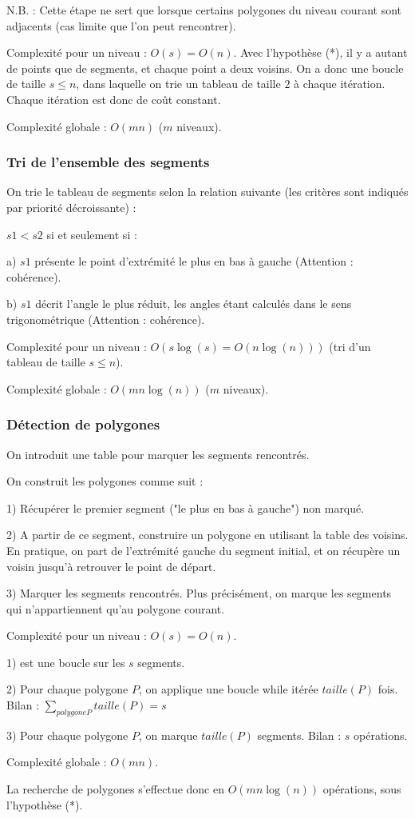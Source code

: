 \documentclass{article}
\begin{document}
N.B. : Cette étape ne sert que lorsque certains polygones du niveau courant sont adjacents (cas limite que l'on peut rencontrer).

Complexité pour un niveau : $O(s) =  O(n)$. Avec l'hypothèse (*), il y a autant de points que de segments, et chaque point a deux voisins. On a donc une boucle de taille $s \leq n$, dans laquelle on trie un tableau de taille $2$ à chaque itération. Chaque itération est donc de coût constant.

Complexité globale : $O(mn)$ ($m$ niveaux).

\subsubsection{Tri de l'ensemble des segments}

On trie le tableau de segments selon la relation suivante (les critères sont indiqués par priorité décroissante) :

$s1 < s2$ si et seulement si :

a) $s1$ présente le point d’extrémité le plus en bas à gauche (Attention : cohérence).

b) $s1$ décrit l'angle le plus réduit, les angles étant calculés dans le sens trigonométrique (Attention : cohérence).

Complexité pour un niveau : $O(s\log(s) = O(n\log(n)))$ (tri d'un tableau de taille $s \leq n$).

Complexité globale : $O(mn\log(n))$ ($m$ niveaux).

\subsubsection{Détection de polygones}

On introduit une table pour marquer les segments rencontrés.

On construit les polygones comme suit :

1) Récupérer le premier segment ("le plus en bas à gauche") non marqué.

2) A partir de ce segment, construire un polygone en utilisant la table des voisins. En pratique, on part de l'extrémité gauche du segment initial, et on récupère un voisin jusqu'à retrouver le point de départ.

3) Marquer les segments rencontrés. Plus précisément, on marque les segments qui n'appartiennent qu'au polygone courant.

Complexité pour un niveau : $O(s) = O(n)$.

1) est une boucle sur les $s$ segments.

2) Pour chaque polygone $P$, on applique une boucle while itérée $taille(P)$ fois. Bilan : $\sum_{polygone P} taille(P) = s$

3) Pour chaque polygone $P$, on marque $taille(P)$ segments. Bilan : $s$ opérations.

Complexité globale : $O(mn)$.

La recherche de polygones s'effectue donc en $O(mn\log(n))$ opérations, sous l'hypothèse (*).
\end{document}
